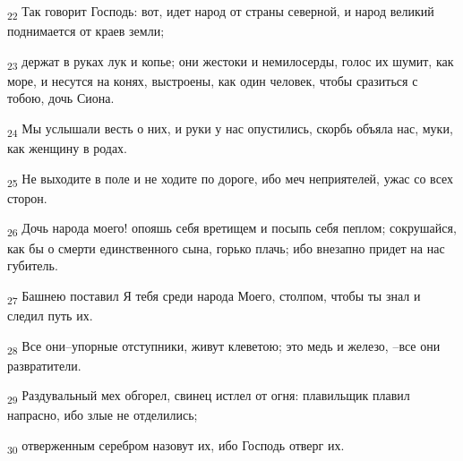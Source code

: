 \begin{tcolorbox}
\textsubscript{22} Так говорит Господь: вот, идет народ от страны северной, и народ великий поднимается от краев земли;
\end{tcolorbox}
\begin{tcolorbox}
\textsubscript{23} держат в руках лук и копье; они жестоки и немилосерды, голос их шумит, как море, и несутся на конях, выстроены, как один человек, чтобы сразиться с тобою, дочь Сиона.
\end{tcolorbox}
\begin{tcolorbox}
\textsubscript{24} Мы услышали весть о них, и руки у нас опустились, скорбь объяла нас, муки, как женщину в родах.
\end{tcolorbox}
\begin{tcolorbox}
\textsubscript{25} Не выходите в поле и не ходите по дороге, ибо меч неприятелей, ужас со всех сторон.
\end{tcolorbox}
\begin{tcolorbox}
\textsubscript{26} Дочь народа моего! опояшь себя вретищем и посыпь себя пеплом; сокрушайся, как бы о смерти единственного сына, горько плачь; ибо внезапно придет на нас губитель.
\end{tcolorbox}
\begin{tcolorbox}
\textsubscript{27} Башнею поставил Я тебя среди народа Моего, столпом, чтобы ты знал и следил путь их.
\end{tcolorbox}
\begin{tcolorbox}
\textsubscript{28} Все они--упорные отступники, живут клеветою; это медь и железо, --все они развратители.
\end{tcolorbox}
\begin{tcolorbox}
\textsubscript{29} Раздувальный мех обгорел, свинец истлел от огня: плавильщик плавил напрасно, ибо злые не отделились;
\end{tcolorbox}
\begin{tcolorbox}
\textsubscript{30} отверженным серебром назовут их, ибо Господь отверг их.
\end{tcolorbox}

